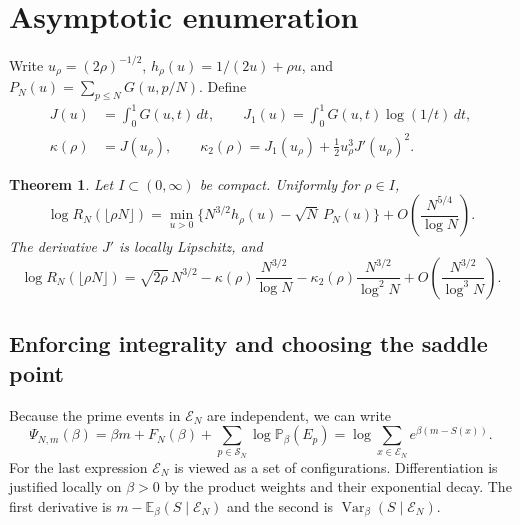 \documentclass[11pt]{amsart}
\newtheorem{theorem}{Theorem}[section]
\theoremstyle{remark}
\DeclareMathOperator{\Var}{Var}
\newcommand{\Pp}{\mathbb P}
\newcommand{\Ee}{\mathbb E}
\begin{document}
\clearpage
\section{Asymptotic enumeration}
\label{sec:enumeration}

Write \(u_\rho=(2\rho)^{-1/2}\), \(h_\rho(u)=1/(2u)+\rho u\), and \(P_N(u)=\sum_{p\le N}G(u,p/N)\). Define
\begin{equation}
 \begin{split}
 J(u)&=\int_0^1G(u,t)\,dt,\qquad
 J_1(u)=\int_0^1 G(u,t)\log(1/t)\,dt,\\
 \kappa(\rho)&=J(u_\rho),\qquad
 \kappa_2(\rho)=J_1(u_\rho)+\tfrac12 u_\rho^3J'(u_\rho)^2 .
 \end{split}
 \label{eq:kappas}
\end{equation}

\begin{theorem}
\label{thm:enumeration}
Let \(I\subset(0,\infty)\) be compact. Uniformly for \(\rho\in I\),
\begin{equation}
 \log R_N(\lfloor\rho N\rfloor)
 =\min_{u>0}\{N^{3/2}h_\rho(u)-\sqrt N\,P_N(u)\}
   +O\!\left(\frac{N^{5/4}}{\log N}\right).
 \label{eq:prime-variational}
\end{equation}
The derivative \(J'\) is locally Lipschitz, and
\begin{equation}
 \log R_N(\lfloor\rho N\rfloor)
 =\sqrt{2\rho}\,N^{3/2}
 -\kappa(\rho)\frac{N^{3/2}}{\log N}
 -\kappa_2(\rho)\frac{N^{3/2}}{\log^2 N}
 +O\!\left(\frac{N^{3/2}}{\log^3 N}\right).
 \label{eq:three-terms}
\end{equation}
\end{theorem}

\subsection{Enforcing integrality and choosing the saddle point}

Because the prime events in \(\mathcal E_N\) are independent, we can write
\begin{equation}
 \Psi_{N,m}(\beta)=\beta m+F_N(\beta)+\sum_{p\in\mathcal S_N}\log\Pp_\beta(E_p)
                 =\log\sum_{x\in \mathcal E_N}e^{\beta(m-S(x))}.
 \label{eq:psi-saddle}
\end{equation}
For the last expression \(\mathcal E_N\) is viewed as a set of configurations. Differentiation is justified locally on \(\beta>0\) by the product weights and their exponential decay. The first derivative is \(m-\Ee_\beta(S\mid \mathcal E_N)\) and the second is \(\Var_\beta(S\mid \mathcal E_N)\).
\end{document}
